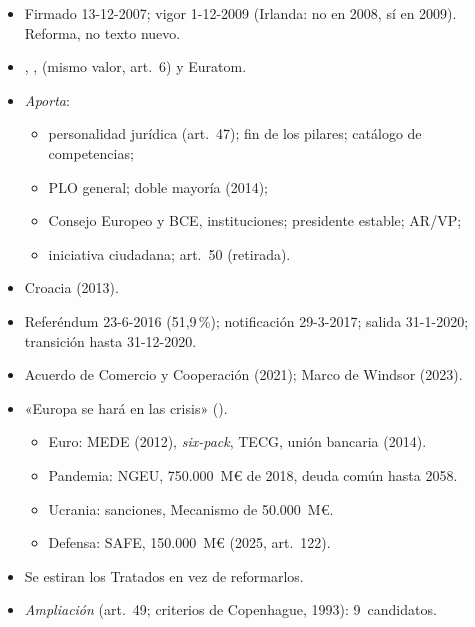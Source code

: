 \documentclass{article}
\begin{document}
\begin{columnas}
\begin{itemize}
\item Firmado 13-12-2007; vigor 1-12-2009 (Irlanda: no en 2008, sí en 2009). Reforma, no texto nuevo.
\item {}, ,  (mismo valor, art.~6) y Euratom.
\item \emph{Aporta}:
  \begin{itemize}
  \item personalidad jurídica (art.~47); fin de los pilares; catálogo de competencias;
  \item PLO general; doble mayoría (2014);
  \item Consejo Europeo y BCE, instituciones; presidente estable; AR/VP;
  \item iniciativa ciudadana; art.~50 (retirada).
  \end{itemize}
\item Croacia (2013).
\end{itemize}
\begin{itemize}
\item Referéndum 23-6-2016 (51,9\,\%); notificación 29-3-2017; salida 31-1-2020; transición hasta 31-12-2020.
\item Acuerdo de Comercio y Cooperación (2021); Marco de Windsor (2023).
\end{itemize}
\begin{itemize}
\item «Europa se hará en las crisis» ().
  \begin{itemize}
  \item Euro: MEDE (2012), \emph{six-pack}, TECG, unión bancaria (2014).
  \item Pandemia: NGEU, 750.000~M€ de 2018, deuda común hasta 2058.
  \item Ucrania: sanciones, Mecanismo de 50.000~M€.
  \item Defensa: SAFE, 150.000~M€ (2025, art.~122).
  \end{itemize}
\item Se estiran los Tratados en vez de reformarlos.
\end{itemize}
\begin{itemize}
\item \emph{Ampliación} (art.~49; criterios de Copenhague, 1993): 9~candidatos.

\end{itemize}
\end{columnas}
\end{document}
